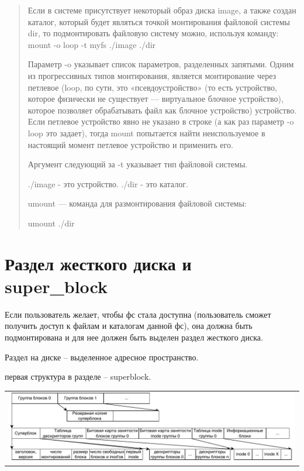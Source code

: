 \begin{quote}
	Если в системе присутствует некоторый образ диска image, а также создан каталог, который будет являться точкой монтирования файловой системы dir, то подмонтировать файловую систему можно, используя команду: mount -o loop -t myfs ./image ./dir
	
	Параметр -o указывает список параметров, разделенных запятыми. Одним из прогрессивных типов монтирования, является монтирование через петлевое (loop, по сути, это «псевдоустройство» (то есть устройство, которое физически не существует --- виртуальное блочное устройство), которое позволяет обрабатывать файл как блочное устройство) устройство. Если петлевое устройство явно не указано в строке (а как раз параметр -o loop это задает), тогда mount попытается найти неиспользуемое в настоящий момент петлевое устройство и применить его.
	
	Аргумент следующий за -t указывает тип файловой системы.
	
	./image - это устройство. ./dir - это каталог.
	
	umount — команда для размонтирования файловой системы:
	
	umount ./dir
\end{quote}

\section{Раздел жесткого диска и super\_block}
\par Если пользователь желает, чтобы фс стала доступна (пользователь сможет получить доступ к файлам и каталогам данной фс), она должна быть подмонтирована и для нее должен быть выделен раздел жесткого диска.
\par Раздел на диске -- выделенное адресное пространство.
\par первая структура в разделе -- superblock.

\begin{table}[h!]
  \centering
  \begin{tabular}{p{1\linewidth}}
    \centering
    \includegraphics[width=1\linewidth]{./images/partition.pdf}
  \end{tabular}
\end{table}

